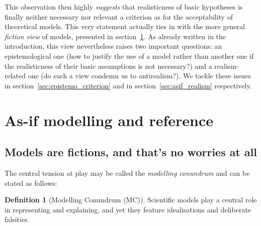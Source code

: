 \documentclass[a4paper,11pt]{article}
\theoremstyle{definition}
\newtheorem{definition}{Definition}
\begin{document}
This observation then highly \textit{suggests} that realisticness of basic hypotheses is finally neither necessary nor relevant a criterion as for the acceptability of theoretical models. This very statement actually ties in with the more general \textit{fiction view} of models, presented in section~\ref{sec:asifVerifJust}. As already written in the introduction, this view nevertheless raises two important questions: an epistemological one (how to justify the use of a model rather than another one if the realisticness of their basic assumptions is not necessary?) and a realism-related one (do such a view condemn us to antirealism?). We tackle these issues in section~\ref{sec:epistemo_criterion} and in section~\ref{sec:asif_realism} respectively.

\section{As-if modelling and reference}
\label{sec:asifVerifJust}

\subsection{Models are fictions, and that's no worries at all}

The central tension at play may be called the \textit{modelling conundrum} and can be stated as follows:

\begin{definition}[Modelling Conundrum (MC)]
    Scientific models play a central role in representing and explaining, and yet they feature idealisations and deliberate falsities.
\label{def:conundrum}
\end{definition}
\end{document}
